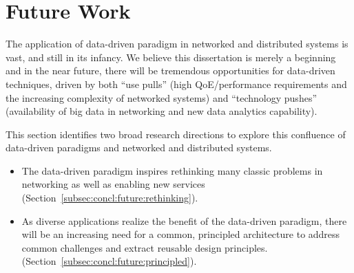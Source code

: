 
\section{Future Work}
\label{sec:concl:future}

The application of data-driven paradigm in networked and distributed systems is vast, 
and still in its infancy. We believe this dissertation is merely a beginning and in the 
near future, there will be tremendous opportunities for data-driven techniques, driven by 
both ``use pulls'' (high QoE/performance requirements and the increasing complexity of 
networked systems) and ``technology pushes'' (availability of big data in networking and 
new data analytics capability).

This section identifies two broad research directions to explore this confluence of 
data-driven paradigms and networked and distributed systems.
\begin{itemize}
\item The data-driven paradigm inspires rethinking many classic problems in networking 
as well as enabling new services (Section~\ref{subsec:concl:future:rethinking}). 
\item As diverse applications realize the benefit of the data-driven paradigm, there will be an 
increasing need for a common, principled architecture to address common challenges and
extract reusable design principles.
 (Section~\ref{subsec:concl:future:principled}). 
\end{itemize}


